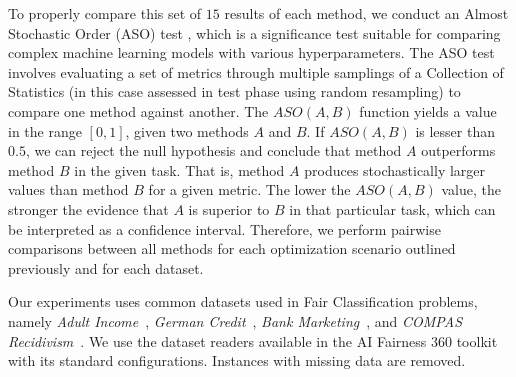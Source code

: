 To properly compare this set of $15$ results of each method, we conduct an Almost Stochastic Order (ASO) test \citep{dror2019deep}, which is a significance test suitable for comparing complex machine learning models with various hyperparameters. The ASO test involves evaluating a set of metrics through multiple samplings of a Collection of Statistics (in this case assessed in test phase using random resampling) to compare one method against another. The $ASO(A, B)$ function yields a value in the range $[0, 1]$, given two methods $A$ and $B$. If $ASO(A, B)$ is lesser than $0.5$, we can reject the null hypothesis and conclude that method $A$ outperforms method $B$ in the given task. That is, method $A$ produces stochastically larger values than method $B$ for a given metric. The lower the $ASO(A, B)$ value, the stronger the evidence that $A$ is superior to $B$ in that particular task, which can be interpreted as a confidence interval. Therefore, we perform pairwise comparisons between all methods for each optimization scenario outlined previously and for each dataset.


Our experiments uses common datasets used in Fair Classification problems, namely \textit{Adult Income}~\citep{misc_adult_2}, \textit{German Credit}~\citep{misc_statlog_(german_credit_data)_144}, \textit{Bank Marketing}~\citep{misc_bank_marketing_222}, and \textit{COMPAS Recidivism}~\citep{misc_compas}. We use the dataset readers available in the AI Fairness 360 toolkit~\citep{aif360-oct-2018} with its standard configurations. Instances with missing data are removed.

